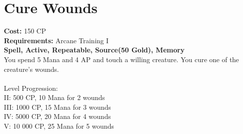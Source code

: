 \section{Cure Wounds}
\textbf{Cost:} 150 CP\\
\textbf{Requirements:}  Arcane Training I\\
\textbf{Spell, Active, Repeatable, Source(50 Gold), Memory}\\
You spend 5 Mana and 4 AP and touch a willing creature. You cure one of the creature's wounds.\\
\\
Level Progression:\\
II: 500 CP, 10 Mana for 2 wounds\\
III: 1000 CP, 15 Mana for 3 wounds\\
IV: 5000 CP, 20 Mana for 4 wounds\\
V: 10 000 CP, 25 Mana for 5 wounds\\